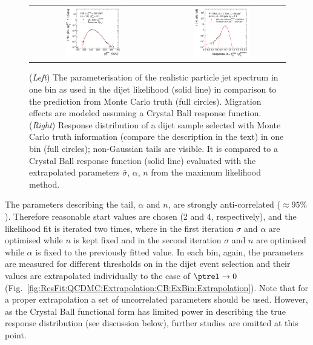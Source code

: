 \begin{figure}[ht]
  \centering
  \begin{tabular}{cc}
    \includegraphics[width=0.45\textwidth]{figures/ResFit_Spring10QCDFlat_CB_Eta0_Spectrum_PtBin4} &
    \includegraphics[width=0.45\textwidth]{figures/ResFit_Spring10QCDFlat_CB_Eta0_MCClosure_PtBin4}
  \end{tabular}
\caption{(\textit{Left}) The parameterisation of the realistic particle jet \pt spectrum in one \pt bin as used in the dijet likelihood (solid line) in comparison to the prediction from Monte Carlo truth (full circles).
  Migration effects are modeled assuming a Crystal Ball response function. 
  (\textit{Right}) Response distribution of a dijet sample selected with Monte Carlo truth information (compare the description in the text) in one \pt bin (full circles); non-Gaussian tails are visible.
  It is compared to a Crystal Ball response function (solid line) evaluated with the extrapolated parameters $\bar{\sigma}$, $\alpha$, $n$ from the maximum likelihood method.}
\label{fig:ResFit:QCDMC:Extrapolation:CB:ExBin:SpectrumAndMCClosure}
\end{figure}

The parameters describing the tail, $\alpha$ and $n$, are strongly anti-correlated ($\approx95\%$).
Therefore reasonable start values are chosen (2 and 4, respectively), and the likelihood fit is iterated two times, where in the first iteration $\sigma$ and $\alpha$ are optimised while $n$ is kept fixed and in the second iteration $\sigma$ and $n$ are optimised while $\alpha$ is fixed to the previously fitted value.
In each \pt bin, again, the parameters are measured for different thresholds on \ptrel in the dijet event selection and their values are extrapolated individually to the case of $\ptrel\rightarrow0$ (Fig.~\ref{fig:ResFit:QCDMC:Extrapolation:CB:ExBin:Extrapolation}).
Note that for a proper extrapolation a set of uncorrelated parameters should be used.
However, as the Crystal Ball functional form has limited power in describing the true response distribution (see discussion below), further studies are omitted at this point.

